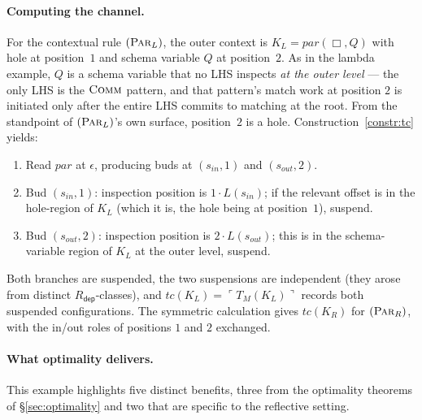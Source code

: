 \documentclass[11pt]{article}
\theoremstyle{plain}
\theoremstyle{definition}
\theoremstyle{remark}
\newcommand{\reflect}[1]{\ulcorner #1 \urcorner}
\newcommand{\rdep}{R_{\mathsf{dep}}}
\begin{document}
\paragraph{Computing the channel.}
For the contextual rule $(\textsc{Par}_{L})$, the outer context is
$K_{L} = \mathit{par}(\Box, Q)$ with hole at position~$1$ and schema
variable $Q$ at position~$2$. As in the lambda example, $Q$ is a
schema variable that no LHS inspects \emph{at the outer level} ---
the only LHS is the $\textsc{Comm}$ pattern, and that pattern's match
work at position $2$ is initiated only after the entire LHS commits to
matching at the root. From the standpoint of $(\textsc{Par}_{L})$'s
own surface, position~$2$ is a hole. Construction~\ref{constr:tc}
yields:
\begin{enumerate}[leftmargin=2em,label=\arabic*.]
  \item Read $\mathit{par}$ at $\epsilon$, producing buds at
        $(s_{\mathit{in}}, 1)$ and $(s_{\mathit{out}}, 2)$.
  \item Bud $(s_{\mathit{in}}, 1)$: inspection position is $1 \cdot
        L(s_{\mathit{in}})$; if the relevant offset is in the
        hole-region of $K_{L}$ (which it is, the hole being at
        position~$1$), suspend.
  \item Bud $(s_{\mathit{out}}, 2)$: inspection position is $2 \cdot
        L(s_{\mathit{out}})$; this is in the schema-variable region of
        $K_{L}$ at the outer level, suspend.
\end{enumerate}
Both branches are suspended, the two suspensions are independent (they
arose from distinct $\rdep$-classes), and $tc(K_{L}) =
\reflect{T_{M}(K_{L})}$ records both suspended configurations. The
symmetric calculation gives $tc(K_{R})$ for $(\textsc{Par}_{R})$, with
the in/out roles of positions $1$ and $2$ exchanged.

\paragraph{What optimality delivers.}
This example highlights five distinct benefits, three from the
optimality theorems of \S\ref{sec:optimality} and two that are
specific to the reflective setting.
\end{document}
